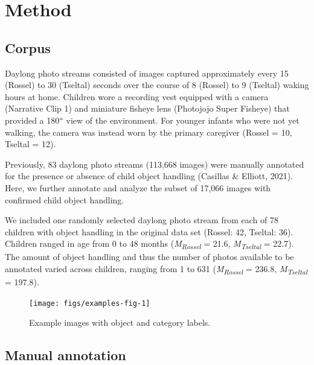 \documentclass[10pt, letterpaper]{article}
\newenvironment{CodeChunk}{}{}
\begin{document}
\hypertarget{method}{%
\section{Method}\label{method}}

\hypertarget{corpus}{%
\subsection{Corpus}\label{corpus}}

Daylong photo streams consisted of images captured approximately every
15 (Rossel) to 30 (Tseltal) seconds over the course of 8 (Rossel) to 9
(Tseltal) waking hours at home. Children wore a recording vest equipped
with a camera (Narrative Clip 1) and miniature fisheye lens (Photojojo
Super Fisheye) that provided a 180\(\text{\textdegree}\) view of the
environment. For younger infants who were not yet walking, the camera
was instead worn by the primary caregiver (Rossel = 10, Tseltal = 12).

Previously, 83 daylong photo streams (113,668 images) were manually
annotated for the presence or absence of child object handling (Casillas
\& Elliott, 2021). Here, we further annotate and analyze the subset of
17,066 images with confirmed child object handling.

We included one randomly selected daylong photo stream from each of 78
children with object handling in the original data set (Rossel: 42,
Tseltal: 36). Children ranged in age from 0 to 48 months
(\emph{M}\textsubscript{\emph{Rossel}} = 21.6,
\emph{M}\textsubscript{\emph{Tseltal}} = 22.7). The amount of object
handling and thus the number of photos available to be annotated varied
across children, ranging from 1 to 631
(\emph{M}\textsubscript{\emph{Rossel}} = 236.8,
\emph{M}\textsubscript{\emph{Tseltal}} = 197.8).

\begin{CodeChunk}
\begin{figure}[h]

{\centering \texttt{[image: figs/examples-fig-1]} 

}

\caption[Example images with object and category labels]{Example images with object and category labels.}\label{fig:examples-fig}
\end{figure}
\end{CodeChunk}

\hypertarget{manual-annotation}{%
\subsection{Manual annotation}\label{manual-annotation}}
\end{document}
